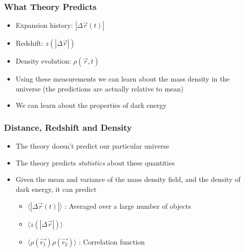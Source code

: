 \documentclass{beamer}
\begin{document}
\frame
{

    \frametitle{What Theory Predicts}


    \begin{itemize}

            

        \item Expansion history: {\color{gold} $|\Delta \vec{r} (t)|$ }


        \item Redshift: {\color{gold} $z(|\Delta \vec{r}|)$}


        \item Density evolution: {\color{gold} $\rho(\vec{r},t)$}


        \item Using these measurements we can learn about the mass density in
            the universe (the predictions are actually relative to mean)
            
        \item We can learn about the properties of dark energy



    \end{itemize}

}

\frame
{

    \frametitle{Distance, Redshift and Density}


    \begin{itemize}

        \item The theory doesn't predict our particular universe

        \item The theory predicts {\em statistics} about these quantities
            
        \item Given the mean and variance of the mass density field, and the
            density of dark energy, it can predict

            \begin{itemize}

                \item {\color{gold} $\langle |\Delta \vec{r} (t)| \rangle$ }: Averaged
                    over a large number of objects

                \item {\color{gold} $\langle z(|\Delta \vec{r}|) \rangle$}

                \item {\color{gold} $\langle \rho(\vec{r_1}) \rho(\vec{r_2})
                    \rangle$ }: Correlation function

            \end{itemize}

    \end{itemize}

}
\end{document}
